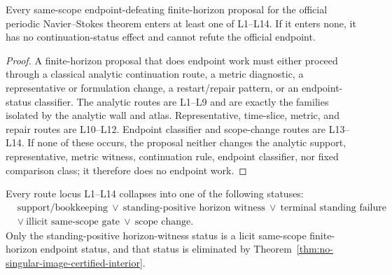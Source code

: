 \begin{theorem}\label{thm:ns-route-locus-exhaustion}
Every same-scope endpoint-defeating finite-horizon proposal for the official periodic Navier--Stokes theorem enters at least one of L1--L14. If it enters none, it has no continuation-status effect and cannot refute the official endpoint.
\end{theorem}

\begin{proof}
A finite-horizon proposal that does endpoint work must either proceed through a classical analytic continuation route, a metric diagnostic, a representative or formulation change, a restart/repair pattern, or an endpoint-status classifier. The analytic routes are L1--L9 and are exactly the families isolated by the analytic wall and atlas. Representative, time-slice, metric, and repair routes are L10--L12. Endpoint classifier and scope-change routes are L13--L14. If none of these occurs, the proposal neither changes the analytic support, representative, metric witness, continuation rule, endpoint classifier, nor fixed comparison class; it therefore does no endpoint work.
\end{proof}

\begin{theorem}\label{thm:ns-route-locus-collapse}
Every route locus L1--L14 collapses into one of the following statuses:
\[
\begin{aligned}
&\text{support/bookkeeping}\ \vee\ 
\text{standing-positive horizon witness}\ \vee\ 
\text{terminal standing failure}\\
&\vee\ \text{illicit same-scope gate}\ \vee\ 
\text{scope change}.
\end{aligned}
\]
Only the standing-positive horizon-witness status is a licit same-scope finite-horizon endpoint status, and that status is eliminated by Theorem~\ref{thm:no-singular-image-certified-interior}.
\end{theorem}

